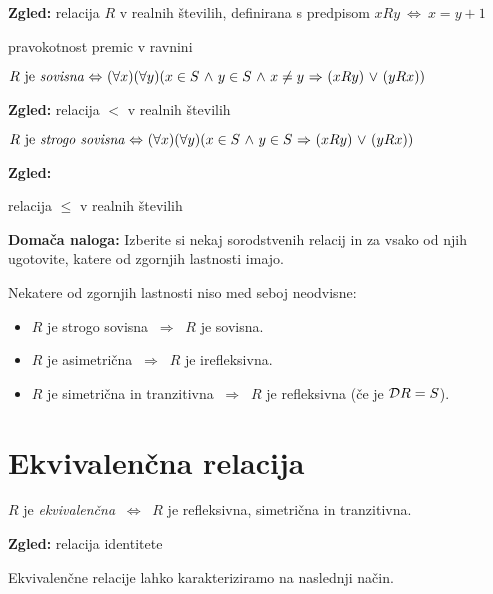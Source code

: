 \documentclass[11pt,paper=b5,footinclude,headinclude]{scrbook} %
\def\ali {{~\vee~}}
\def\inn {{~\wedge~}}
\def\sledi {{~\Rightarrow~}}
\def\cee {{~\Leftrightarrow~}}
\begin{document}

\textbf{ Zgled:}
relacija $R$ v realnih številih, definirana s predpisom $xRy \cee x = y + 1$

pravokotnost premic v ravnini

\bigskip

$R \textrm{ je {\em sovisna}} \cee (\forall x)(\forall y)(x\in S\inn y\in S
\inn x\neq y\sledi (xRy)\ali (yRx))$


\textbf{ Zgled:}
relacija $<$ v realnih  številih

\bigskip

$R \textrm{ je {\em strogo sovisna}} \cee (\forall x)(\forall y)(x\in S\inn y\in S
\sledi (xRy)\ali (yRx))$


\textbf{ Zgled:}

relacija $\le$ v realnih številih

\bigskip
\textbf{ Domača naloga:}
Izberite si nekaj sorodstvenih relacij in za vsako od njih ugotovite, katere od zgornjih lastnosti imajo.

\bigskip
Nekatere od zgornjih lastnosti niso med seboj neodvisne:
\begin{itemize}
  \item $R$ je strogo sovisna $\sledi$ $R$ je sovisna.
  \item $R$ je asimetrična $\sledi$ $R$ je irefleksivna.
  \item $R$ je simetrična in tranzitivna $\sledi$ $R$ je refleksivna (če je ${\cal D}R = S$).
\end{itemize}

\section{Ekvivalenčna relacija}

$R$ je {\em ekvivalenčna} $\cee$ $R$ je refleksivna, simetrična in tranzitivna.

\textbf{ Zgled:} relacija identitete

\bigskip
Ekvivalenčne relacije lahko karakteriziramo na naslednji način.
\end{document}
